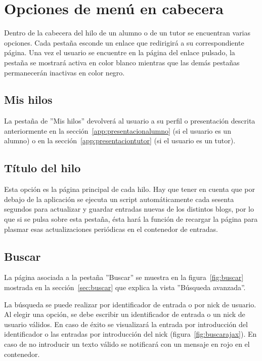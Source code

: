 \documentclass[a4paper, 12pt]{book}
\begin{document}
\section{Opciones de men\'u en cabecera}
Dentro de la cabecera del hilo de un alumno o de un tutor se encuentran varias opciones. Cada pesta\~na esconde un enlace que redirigir\'a a su 
correspondiente p\'agina. Una vez el usuario se encuentre en la p\'agina del enlace pulsado, la pesta\~na se mostrar\'a activa en color blanco mientras que 
las dem\'as pesta\~nas permanecer\'an inactivas en color negro.

\subsection{Mis hilos}
La pesta\~na de ''Mis hilos'' devolver\'a al usuario a su perfil o presentaci\'on descrita anteriormente en la secci\'on~\ref{app:presentacionalumno} (si el usuario
es un alumno) o en la secci\'on~\ref{app:presentaciontutor} (si el usuario es un tutor).

\subsection{T\'itulo del hilo}
Esta opci\'on es la p\'agina principal de cada hilo. Hay que tener en cuenta que por debajo de la aplicaci\'on se ejecuta un script autom\'aticamente cada 
sesenta segundos para actualizar y guardar entradas nuevas de los distintos blogs, por lo que si se pulsa sobre esta pesta\~na, \'esta har\'a la funci\'on 
de recargar la p\'agina para plasmar esas actualizaciones peri\'odicas en el contenedor de entradas.

\subsection{Buscar}
La p\'agina asociada a la pesta\~na ''Buscar'' se muestra en la figura~\ref{fig:buscar} mostrada en la secci\'on~\ref{sec:buscar} que explica la 
vista ''B\'usqueda avanzada''.

La b\'usqueda se puede realizar por identificador de entrada o por nick de usuario. Al elegir una opci\'on, se debe escribir un identificador de entrada o 
un nick de usuario v\'alidos. En caso de \'exito se visualizar\'a la entrada por introducci\'on del identificador o las entradas por introducci\'on del nick
(figura~\ref{fig:buscarajax}). En caso de no introducir un texto v\'alido se notificar\'a con un mensaje en rojo en el contenedor.
\end{document}
